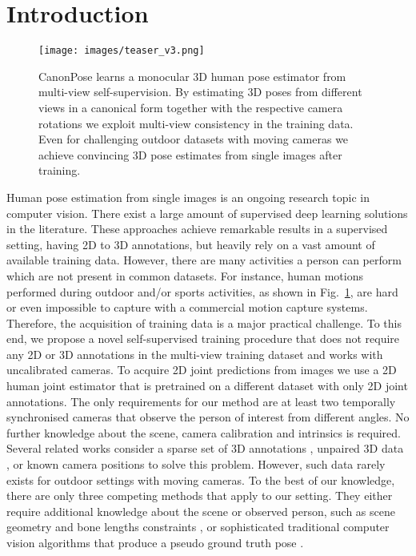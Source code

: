 \documentclass[final]{cvpr}
\begin{document}
\section{Introduction}
\begin{figure}
	\centering
	\texttt{[image: images/teaser\_v3.png]}
	\caption{CanonPose learns a monocular 3D human pose estimator from multi-view self-supervision. By estimating 3D poses from different views in a canonical form together with the respective camera rotations we exploit multi-view consistency in the training data. Even for challenging outdoor datasets with moving cameras we achieve convincing 3D pose estimates from single images after training.}
	\label{fig:teaser}
\end{figure}
Human pose estimation from single images is an ongoing research topic in computer vision.
There exist a large amount of supervised deep learning solutions in the literature. These approaches achieve remarkable results in a supervised setting, \ie having 2D to 3D annotations, but heavily rely on a vast amount of available training data.
However, there are many activities a person can perform which are not present in common datasets.
For instance, human motions performed during outdoor and/or sports activities, \eg as shown in Fig.~\ref{fig:teaser}, are hard or even impossible to capture with a commercial motion capture systems.
Therefore, the acquisition of training data is a major practical challenge.
To this end, we propose a novel self-supervised training procedure that does not require any 2D or 3D annotations in the multi-view training dataset and works with uncalibrated cameras.
To acquire 2D joint predictions from images we use a 2D human joint estimator \cite{fang2017rmpe_alphapose} that is pretrained on a different dataset with only 2D joint annotations.
The only requirements for our method are at least two temporally synchronised cameras that observe the person of interest from different angles. 
No further knowledge about the scene, camera calibration and intrinsics is required.
Several related works consider a sparse set of 3D annotations \cite{rhodin2018learning,rhodin2019neural,Unsup3DPose}, unpaired 3D data \cite{WanRos2019a,Wang_2019_ICCV,Kundu_2020_CVPR}, or known camera positions \cite{rhodin2018learning,rhodin2019neural} to solve this problem.
However, such data rarely exists for outdoor settings with moving cameras.
To the best of our knowledge, there are only three competing methods \cite{chen2019unsupervised,kocabas2019epipolar,Iqbal_2020_CVPR} that apply to our setting.
They either require additional knowledge about the scene or observed person, such as scene geometry \cite{chen2019unsupervised} and bone lengths constraints \cite{Iqbal_2020_CVPR}, or sophisticated traditional computer vision algorithms that produce a pseudo ground truth pose \cite{kocabas2019epipolar}.
\end{document}
